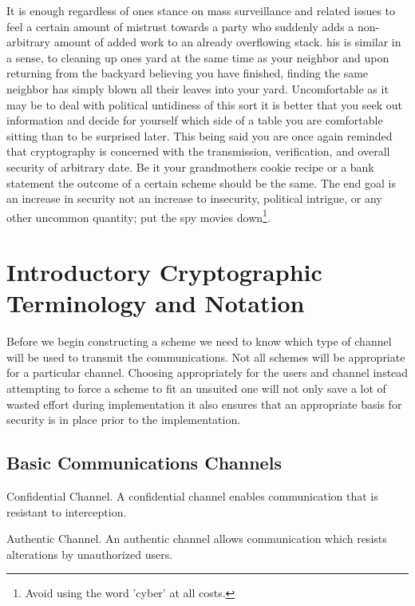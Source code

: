 It is enough regardless of ones stance on mass surveillance and related issues to feel a certain amount of mistrust towards a party who suddenly adds a non-arbitrary amount of added work to an already overflowing stack. his is similar in a sense, to cleaning up ones yard at the same time as your neighbor and upon returning from the backyard believing you have finished, finding the same neighbor has simply blown all their leaves into your yard. Uncomfortable as it may be to deal with political untidiness of this sort it is better that you seek out information and decide for yourself which side of a table you are comfortable sitting than to be surprised later. This being said you are once again reminded that cryptography is concerned with the transmission, verification, and overall security of arbitrary date. Be it your grandmothers cookie recipe or a bank statement the outcome of a certain scheme should be the same. The end goal is an increase in security not an increase to insecurity, political intrigue, or any other uncommon quantity; put the spy movies down\footnote{Avoid using the word 'cyber' at all costs.}. 


\section{Introductory Cryptographic Terminology and Notation}


Before we begin constructing a scheme we need to know which type of channel will be used to transmit the communications. Not all schemes will be appropriate for a particular channel. Choosing appropriately for the users and channel instead attempting to force a scheme to fit an unsuited one will not only save a lot of wasted effort during implementation it also ensures that an appropriate basis for security is in place prior to the implementation. 


\subsection{Basic Communications Channels}


\begin{defn}{Confidential Channel. }
    A \gls{confidential channel} enables communication that is resistant to interception.
\end{defn}


\medskip
\begin{defn}{Authentic Channel. }
    An \gls{authentic channel} allows communication which resists alterations by unauthorized users.
\end{defn}


